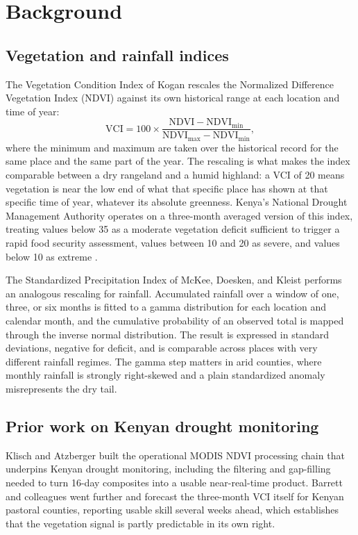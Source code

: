 \documentclass[11pt]{article}
\begin{document}
\section{Background}
\label{sec:background}

\subsection{Vegetation and rainfall indices}

The Vegetation Condition Index of Kogan \cite{kogan1995} rescales the Normalized
Difference Vegetation Index (NDVI) against its own historical range at each
location and time of year:
\begin{equation}
\mathrm{VCI} = 100 \times
\frac{\mathrm{NDVI} - \mathrm{NDVI}_{\min}}
     {\mathrm{NDVI}_{\max} - \mathrm{NDVI}_{\min}},
\label{eq:vci}
\end{equation}
where the minimum and maximum are taken over the historical record for the same
place and the same part of the year. The rescaling is what makes the index
comparable between a dry rangeland and a humid highland: a VCI of 20 means
vegetation is near the low end of what that specific place has shown at that
specific time of year, whatever its absolute greenness. Kenya's National Drought
Management Authority operates on a three-month averaged version of this index,
treating values below 35 as a moderate vegetation deficit sufficient to trigger a
rapid food security assessment, values between 10 and 20 as severe, and values
below 10 as extreme \cite{barrett2020,klisch2016}.

The Standardized Precipitation Index of McKee, Doesken, and Kleist
\cite{mckee1993} performs an analogous rescaling for rainfall. Accumulated
rainfall over a window of one, three, or six months is fitted to a gamma
distribution for each location and calendar month, and the cumulative
probability of an observed total is mapped through the inverse normal
distribution. The result is expressed in standard deviations, negative for
deficit, and is comparable across places with very different rainfall regimes.
The gamma step matters in arid counties, where monthly rainfall is strongly
right-skewed and a plain standardized anomaly misrepresents the dry tail.

\subsection{Prior work on Kenyan drought monitoring}

Klisch and Atzberger \cite{klisch2016} built the operational MODIS NDVI
processing chain that underpins Kenyan drought monitoring, including the
filtering and gap-filling needed to turn 16-day composites into a usable
near-real-time product. Barrett and colleagues \cite{barrett2020} went further
and forecast the three-month VCI itself for Kenyan pastoral counties, reporting
usable skill several weeks ahead, which establishes that the vegetation signal is
partly predictable in its own right.
\end{document}
